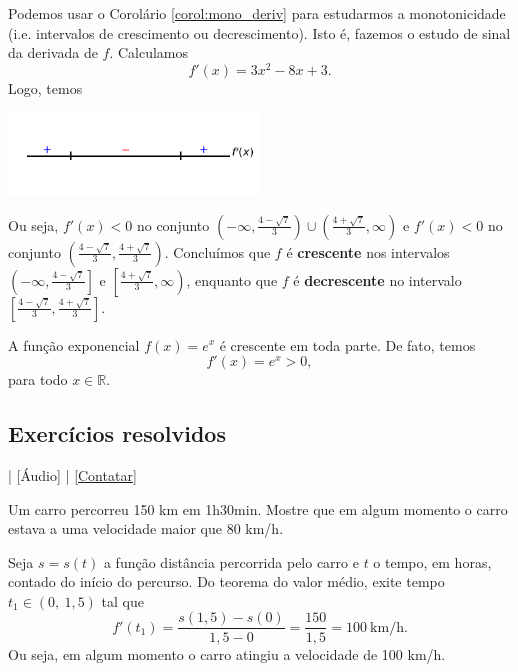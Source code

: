 \begin{ex}
  Podemos usar o Corolário \ref{corol:mono_deriv} para estudarmos a monotonicidade (i.e. intervalos de crescimento ou decrescimento). Isto é, fazemos o estudo de sinal da derivada de $f$. Calculamos
  \begin{equation}
    f'(x) = 3x^2 - 8x + 3.
  \end{equation}
  Logo, temos
  \begin{center}
    \includegraphics[width=0.5\textwidth]{./cap_apderiv/dados/fig_ex_monoderiv_poli/fig_ex_monoderiv_poli}
  \end{center}
  Ou seja, $f'(x) < 0$ no conjunto $\displaystyle \left(-\infty, \frac{4-\sqrt{7}}{3}\right)\cup \left(\frac{4+\sqrt{7}}{3}, \infty\right)$ e $f'(x) < 0$ no conjunto $\displaystyle \left(\frac{4-\sqrt{7}}{3}, \frac{4+\sqrt{7}}{3}\right)$. Concluímos que $f$ é {\bf crescente} nos intervalos $\displaystyle \left(\left.-\infty, \frac{4-\sqrt{7}}{3}\right.\right]$ e $\displaystyle \left[\left.\frac{4+\sqrt{7}}{3}, \infty\right)\right.$, enquanto que $f$ é {\bf decrescente} no intervalo $\displaystyle \left[\frac{4-\sqrt{7}}{3}, \frac{4+\sqrt{7}}{3}\right]$.
\end{ex}

\begin{ex}
  A função exponencial $f(x) = e^x$ é crescente em toda parte. De fato, temos
  \begin{equation}
    f'(x) = e^x > 0,
  \end{equation}
  para todo $x\in\mathbb{R}$.
\end{ex}

\subsection*{Exercícios resolvidos}

\begin{flushright}
  [Vídeo] | [Áudio] | \href{https://phkonzen.github.io/notas/contato.html}{[Contatar]}
\end{flushright}

\begin{exeresol}
  Um carro percorreu 150 km em 1h30min. Mostre que em algum momento o carro estava a uma velocidade maior que 80 km/h.
\end{exeresol}
\begin{resol}
  Seja $s=s(t)$ a função distância percorrida pelo carro e $t$ o tempo, em horas, contado do início do percurso. Do teorema do valor médio, exite tempo $t_1\in (0,~1,5)$ tal que
  \begin{equation}
    f'(t_1) = \frac{s(1,5)-s(0)}{1,5-0} = \frac{150}{1,5} = 100~\text{km/h}.
  \end{equation}
  Ou seja, em algum momento o carro atingiu a velocidade de 100 km/h.
\end{resol}

